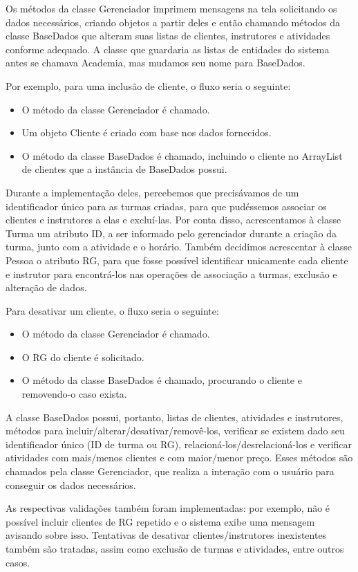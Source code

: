 \documentclass[11pt,twoside]{article}
\begin{document}
Os métodos da classe Gerenciador imprimem mensagens na tela solicitando os dados necessários, criando objetos a partir deles e
então chamando métodos da classe BaseDados que alteram suas listas de clientes, instrutores e atividades conforme adequado.
A classe que guardaria as listas de entidades do sistema antes se chamava Academia, mas mudamos seu nome para BaseDados.

Por exemplo, para uma inclusão de cliente, o fluxo seria o seguinte:
\begin{itemize}
  \item O método da classe Gerenciador é chamado.
  \item Um objeto Cliente é criado com base nos dados fornecidos.
  \item O método da classe BaseDados é chamado, incluindo o cliente no ArrayList de clientes que a instância de
  BaseDados possui.
\end{itemize}

Durante a implementação deles, percebemos que precisávamos de um identificador único para as turmas criadas, para que pudéssemos
associar os clientes e instrutores a elas e excluí-las. Por conta disso, acrescentamos à classe Turma um atributo ID,
a ser informado pelo
gerenciador durante a criação da turma, junto com a atividade e o horário. Também decidimos acrescentar à classe Pessoa o atributo
RG, para que fosse possível identificar unicamente cada cliente e instrutor para encontrá-los nas operações de associação a turmas,
exclusão e alteração de dados.

Para desativar um cliente, o fluxo seria o seguinte:
\begin{itemize}
  \item O método da classe Gerenciador é chamado.
  \item O RG do cliente é solicitado.
  \item O método da classe BaseDados é chamado, procurando o cliente e removendo-o caso exista.
\end{itemize}

A classe BaseDados possui, portanto, listas de clientes, atividades e instrutores, métodos para incluir/alterar/desativar/removê-los,
verificar se existem dado seu identificador único (ID de turma ou RG), relacioná-los/desrelacioná-los e verificar atividades com mais/menos
clientes e com maior/menor preço. Esses métodos são chamados pela classe Gerenciador, que realiza a interação com o usuário para conseguir
os dados necessários.

As respectivas validações também foram implementadas: por exemplo, não é possível incluir clientes de RG repetido e o sistema exibe uma mensagem
avisando sobre isso. Tentativas de desativar clientes/instrutores inexistentes também são tratadas, assim como exclusão de turmas
e atividades, entre outros casos.
\end{document}
